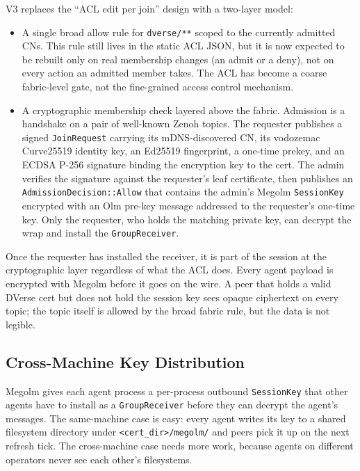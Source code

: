 \documentclass[11pt,a4paper]{article}
\begin{document}
V3 replaces the ``ACL edit per join'' design with a two-layer model:

\begin{itemize}[leftmargin=1.4em]
  \item A single broad allow rule for \texttt{dverse/**} scoped to the
        currently admitted CNs. This rule still lives in the static
        ACL JSON, but it is now expected to be rebuilt only on real
        membership changes (an admit or a deny), not on every action
        an admitted member takes. The ACL has become a coarse
        fabric-level gate, not the fine-grained access control
        mechanism.
  \item A cryptographic membership check layered above the fabric.
        Admission is a handshake on a pair of well-known Zenoh
        topics. The requester publishes a signed \texttt{JoinRequest}
        carrying its mDNS-discovered CN, its vodozemac Curve25519
        identity key, an Ed25519 fingerprint, a one-time prekey, and
        an ECDSA P-256 signature binding the encryption key to the
        cert. The admin verifies the signature against the
        requester's leaf certificate, then publishes an
        \texttt{AdmissionDecision::Allow} that contains the admin's
        Megolm \texttt{SessionKey} encrypted with an Olm pre-key
        message addressed to the requester's one-time key. Only the
        requester, who holds the matching private key, can decrypt
        the wrap and install the \texttt{GroupReceiver}.
\end{itemize}

Once the requester has installed the receiver, it is part of the
session at the cryptographic layer regardless of what the ACL does.
Every agent payload is encrypted with Megolm before it goes on the
wire. A peer that holds a valid DVerse cert but does not hold the
session key sees opaque ciphertext on every topic; the topic itself
is allowed by the broad fabric rule, but the data is not legible.

\subsection{Cross-Machine Key Distribution}

Megolm gives each agent process a per-process outbound
\texttt{SessionKey} that other agents have to install as a
\texttt{GroupReceiver} before they can decrypt the agent's messages.
The same-machine case is easy: every agent writes its key to a
shared filesystem directory under \texttt{<cert\_dir>/megolm/} and
peers pick it up on the next refresh tick. The cross-machine case
needs more work, because agents on different operators never see each
other's filesystems.
\end{document}
